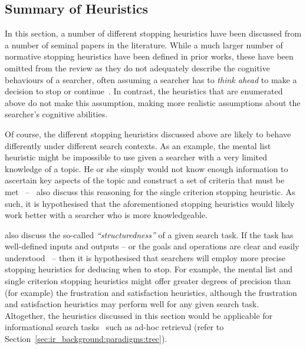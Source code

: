 \subsection{Summary of Heuristics}
In this section, a number of different stopping heuristics have been discussed from a number of seminal papers in the literature. While a much larger number of normative stopping heuristics have been defined in prior works, these have been omitted from the review as they do not adequately describe the cognitive behaviours of a searcher, often assuming a searcher has to \emph{think ahead} to make a decision to stop or continue~\citep{browne2004stopping_rules}. In contrast, the heuristics that are enumerated above do not make this assumption, making more realistic assumptions about the searcher's cognitive abilities.

Of course, the different stopping heuristics discussed above are likely to behave differently under different search contexts. As an example, the mental list heuristic might be impossible to use given a searcher with a very limited knowledge of a topic. He or she simply would not know enough information to ascertain key aspects of the topic and construct a set of criteria that must be met~\citep{browne2005stopping_rules} --~\cite{gigerenzer1999betting} also discuss this reasoning for the single criterion stopping heuristic. As such, it is hypothesised that the aforementioned stopping heuristics would likely work better with a searcher who is more knowledgeable.


\cite{browne2005stopping_rules} also discuss the so-called \emph{``structuredness''} of a given search task. If the task has well-defined inputs and outputs -- or the goals and operations are clear and easily understood~\citep{simon1996sciences} -- then it is hypothesised that searchers will employ more precise stopping heuristics for deducing when to stop. For example, the mental list and single criterion stopping heuristics might offer greater degrees of precision than (for example) the frustration and satisfaction heuristics, although the frustration and satisfaction heuristics may perform well for any given search task. Altogether, the heuristics discussed in this section would be applicable for informational search tasks~\citep{browne2005stopping_rules} such as ad-hoc retrieval (refer to Section~\ref{sec:ir_background:paradigms:trec}).

